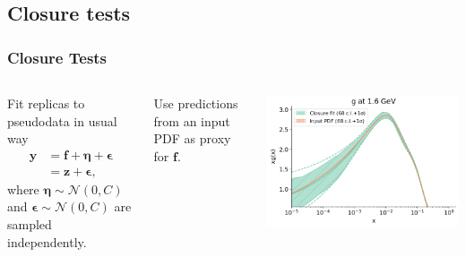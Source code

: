 \newcommand{\shift}{\eta}
\newcommand{\vv}[1]{\boldsymbol{#1}}
\newcommand{\erep}{\mathbf{E}_{\epsilon}}
\newcommand{\eshift}{\mathbf{E}_{\shift}}
\newcommand{\ndata}{N_{\rm data}}
\newcommand\Fontvi{\fontsize{8}{7.2}\selectfont}

\makeatletter
\newcommand{\leqnomode}{\tagsleft@true\let\veqno\@@leqno}
\newcommand{\reqnomode}{\tagsleft@false\let\veqno\@@eqno}
\makeatother

\author[Michael Wilson]{}

\subsection{Closure tests}
\begin{frame}
    \frametitle{Closure Tests}
    \Fontvi
    \begin{columns}[t]
    Fit replicas to pseudodata in usual way
    \leqnomode
    \begin{equation}\label{eq:dataassum}
    \begin{split}
        \vv{y} &= \vv{f} + \vv{\shift} + \vv{\epsilon} \\
        &= \vv{z} + \vv{\epsilon},
    \end{split}
    \end{equation}
    where $\vv{\shift} \sim \mathcal{N}(0, C)$ and $\vv{\epsilon} \sim \mathcal{N}(0, C)$ are sampled independently.
    
    Use predictions from an input PDF as proxy for $\vv{f}$.

    \includegraphics[scale=0.3]{closure_test/plot_pdfs_g.png}
    

\end{columns}
\end{frame}
